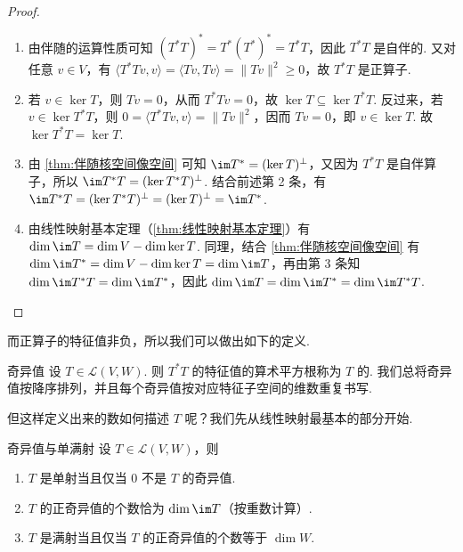 \begin{proof}
    \begin{enumerate}
        \item 由伴随的运算性质可知 $(T^*T)^* = T^*(T^*)^* = T^*T$，因此 $T^*T$ 是自伴的. 又对任意 $v \in V$，有 $\langle T^*Tv, v \rangle = \langle Tv, Tv \rangle = \lVert Tv \rVert^2 \geqslant 0$，故 $T^*T$ 是正算子.

        \item 若 $v \in \ker T$，则 $Tv = 0$，从而 $T^*Tv = 0$，故 $\ker T \subseteq \ker T^*T$. 反过来，若 $v \in \ker T^*T$，则 $0 = \langle T^*Tv, v \rangle = \lVert Tv \rVert^2$，因而 $Tv = 0$，即 $v \in \ker T$. 故 $\ker T^*T = \ker T$.

        \item 由 \autoref{thm:伴随核空间像空间} 可知 $\im T^* = (\ker T)^{\perp}$，又因为 $T^*T$ 是自伴算子，所以 $\im T^*T = (\ker T^*T)^{\perp}$. 结合前述第 2 条，有 $\im T^*T = (\ker T^*T)^{\perp} = (\ker T)^{\perp} = \im T^*$.

        \item 由线性映射基本定理（\autoref{thm:线性映射基本定理}）有 $\dim \im T = \dim V - \dim \ker T$. 同理，结合 \autoref{thm:伴随核空间像空间} 有 $\dim \im T^* = \dim V - \dim \ker T = \dim \im T$，再由第 3 条知 $\dim \im T^*T = \dim \im T^*$，因此 $\dim \im T = \dim \im T^* = \dim \im T^*T$.
    \end{enumerate}
\end{proof}

而正算子的特征值非负，所以我们可以做出如下的定义.

\begin{definition}{奇异值}{} 
    设 $T \in \mathcal{L}(V, W)$. 则 $T^*T$ 的特征值的算术平方根称为 $T$ 的. 我们总将奇异值按降序排列，并且每个奇异值按对应特征子空间的维数重复书写.
\end{definition}

但这样定义出来的数如何描述 $T$ 呢？我们先从线性映射最基本的部分开始.

\begin{theorem}{}{奇异值与单满射}
    设 $T \in \mathcal{L}(V, W)$，则
    \begin{enumerate}
        \item $T$ 是单射当且仅当 $0$ 不是 $T$ 的奇异值.

        \item $T$ 的正奇异值的个数恰为 $\dim \im T$（按重数计算）.

        \item $T$ 是满射当且仅当 $T$ 的正奇异值的个数等于 $\dim W$.
    \end{enumerate}
\end{theorem}

